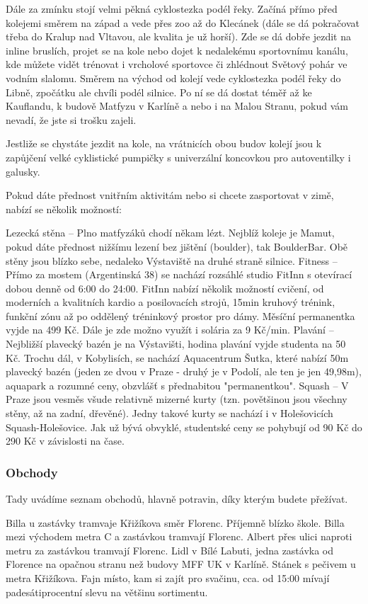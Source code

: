 Dále za zmínku stojí velmi pěkná cyklostezka podél řeky. Začíná přímo před kolejemi směrem na západ a vede přes zoo až do Klecánek (dále se dá pokračovat třeba do Kralup nad Vltavou, ale kvalita je už horší). Zde se dá dobře jezdit na inline bruslích, projet se na kole nebo dojet k nedalekému sportovnímu kanálu, kde můžete vidět trénovat i vrcholové sportovce či zhlédnout Světový pohár ve vodním slalomu. Směrem na východ od kolejí vede cyklostezka podél řeky do Libně, zpočátku ale chvíli podél silnice. Po ní se dá dostat téměř až ke Kauflandu, k budově Matfyzu v Karlíně a nebo i na Malou Stranu, pokud vám nevadí, že jste si trošku zajeli.

Jestliže se chystáte jezdit na kole, na vrátnicích obou budov kolejí jsou k zapůjčení velké cyklistické pumpičky s univerzální koncovkou pro autoventilky i galusky.

Pokud dáte přednost vnitřním aktivitám nebo si chcete zasportovat v zimě, nabízí se několik možností:

Lezecká stěna – Plno matfyzáků chodí někam lézt. Nejblíž koleje je Mamut, pokud dáte přednost nižšímu lezení bez jištění (boulder), tak BoulderBar. Obě stěny jsou blízko sebe, nedaleko Výstaviště na druhé straně silnice.
Fitness – Přímo za mostem (Argentinská 38) se nachází rozsáhlé studio FitInn s otevírací dobou denně od 6:00 do 24:00. FitInn nabízí několik možností cvičení, od moderních a kvalitních kardio a posilovacích strojů, 15min kruhový trénink, funkční zónu až po oddělený tréninkový prostor pro dámy. Měsíční permanentka vyjde na 499 Kč. Dále je zde možno využít i solária za 9 Kč/min.
Plavání – Nejbližší plavecký bazén je na Výstavišti, hodina plavání vyjde studenta na 50 Kč. Trochu dál, v Kobylisích, se nachází Aquacentrum Šutka, které nabízí 50m plavecký bazén (jeden ze dvou v Praze - druhý je v Podolí, ale ten je jen 49,98m), aquapark a rozumné ceny, obzvlášť s přednabitou "permanentkou".
Squash – V Praze jsou vesměs všude relativně mizerné kurty (tzn. povětšinou jsou všechny stěny, až na zadní, dřevěné). Jedny takové kurty se nachází i v Holešovicích Squash-Holešovice. Jak už bývá obvyklé, studentské ceny se pohybují od 90 Kč do 290 Kč v závislosti na čase.


\subsubsection{Obchody}
Tady uvádíme seznam obchodů, hlavně potravin, díky kterým budete přežívat.

Billa u zastávky tramvaje Křižíkova směr Florenc. Příjemně blízko škole.
Billa mezi východem metra C a zastávkou tramvají Florenc.
Albert přes ulici naproti metru za zastávkou tramvají Florenc.
Lidl v Bílé Labuti, jedna zastávka od Florence na opačnou stranu než budovy MFF UK v Karlíně.
Stánek s pečivem u metra Křižíkova. Fajn místo, kam si zajít pro svačinu, cca. od 15:00 mívají padesátiprocentní slevu na většinu sortimentu.

